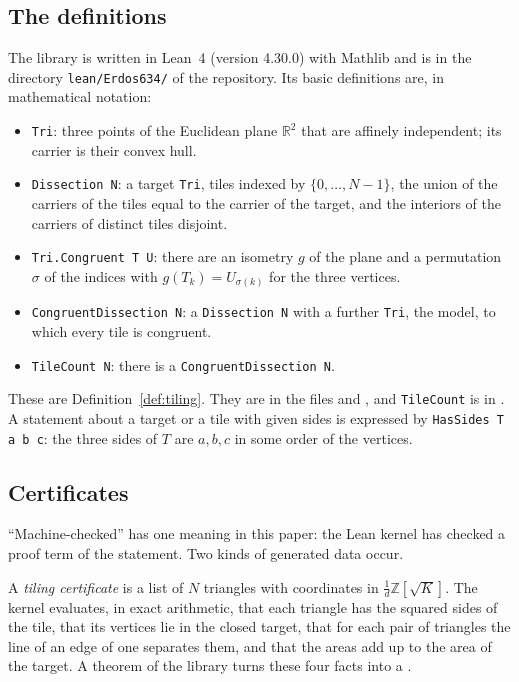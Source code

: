 \documentclass[11pt,reqno]{amsart}
\theoremstyle{plain}
\theoremstyle{definition}
\newcommand{\R}{\mathbb{R}}
\newcommand{\Z}{\mathbb{Z}}
\begin{document}
\subsection{The definitions}\label{sub:leandefs}
The library is written in Lean~4 (version 4.30.0) with Mathlib and is in the directory
\texttt{lean/Erdos634/} of the repository. Its basic definitions are, in mathematical notation:
\begin{itemize}
\item \texttt{Tri}: three points of the Euclidean plane $\R^2$ that are affinely independent; its carrier
is their convex hull.
\item \texttt{Dissection N}: a target \texttt{Tri}, tiles indexed by $\{0,\dots,N-1\}$, the union of the
carriers of the tiles equal to the carrier of the target, and the interiors of the carriers of distinct
tiles disjoint.
\item \texttt{Tri.Congruent T U}: there are an isometry $g$ of the plane and a permutation $\sigma$ of the
indices with $g(T_k)=U_{\sigma(k)}$ for the three vertices.
\item \texttt{CongruentDissection N}: a \texttt{Dissection N} with a further \texttt{Tri}, the model, to
which every tile is congruent.
\item \texttt{TileCount N}: there is a \texttt{CongruentDissection N}.
\end{itemize}
These are Definition~\ref{def:tiling}. They are in the files  and
, and \texttt{TileCount} is in . A statement about a
target or a tile with given sides is expressed by \texttt{HasSides T a b c}: the three sides of $T$ are
$a,b,c$ in some order of the vertices.

\subsection{Certificates}\label{sub:certs}
``Machine-checked'' has one meaning in this paper: the Lean kernel has checked a proof term of the
statement. Two kinds of generated data occur.

A \emph{tiling certificate} is a list of $N$ triangles with coordinates in $\frac1d\Z[\sqrt K]$. The kernel
evaluates, in exact arithmetic, that each triangle has the squared sides of the tile, that its vertices lie
in the closed target, that for each pair of triangles the line of an edge of one separates them, and that
the areas add up to the area of the target. A theorem of the library turns these four facts into a
.
\end{document}
